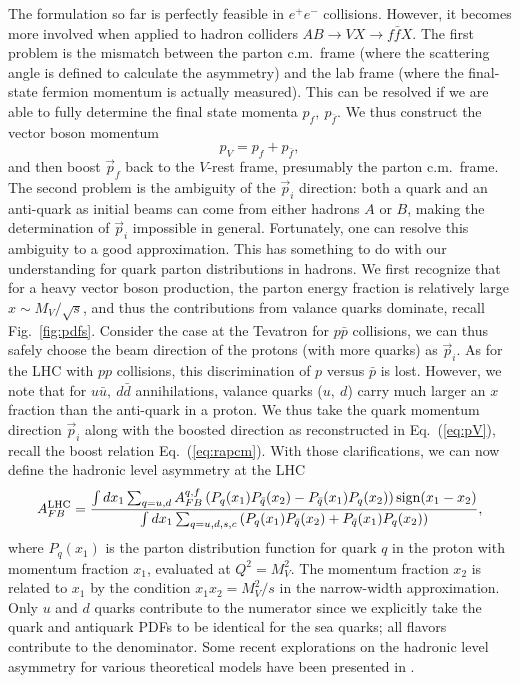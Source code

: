 \documentclass[12pt,prd,aps,floats,preprintnumbers,preprint,superscriptaddress,floatfix,nofootinbib]{revtex4}
\def\epem{e^+e^-}
\def\be{\begin{equation}}
\def\ee{\end{equation}}
\begin{document}
The formulation so far is perfectly feasible in $\epem$ collisions. However,
it becomes more involved when applied to hadron colliders
$AB \to V X \to f \bar f X.$ The first problem
is  the mismatch between the parton c.m.~frame (where the scattering angle
is defined to calculate the asymmetry) 
and the lab frame (where the final-state fermion momentum is actually 
measured). This can be resolved if we are able to fully determine the final
state momenta $p_f,\ p_{\bar f}$.
We thus construct the vector boson momentum 
\be
p^{}_V = p_f + p_{\bar f}, 
\label{eq:pV}
\ee
and then boost $\vec p_f$ back to the $V$-rest frame, presumably the parton
c.m.~frame.
The second problem is the ambiguity of the $\vec p_i$ direction: both a quark 
and an anti-quark  as initial beams 
can come from either hadrons $A$ or $B$, making the 
determination of $\vec p_i$ impossible in general. Fortunately, one can
resolve this ambiguity to a good approximation. This has something to do
with our understanding for quark parton distributions in hadrons. We  first
recognize that for a heavy vector boson production, the parton energy
fraction is relatively large $x\sim M_V/\sqrt s$, and thus the contributions 
from valance quarks dominate, recall Fig.~\ref{fig:pdfs}. 
Consider the case at the Tevatron for $p \bar p$ collisions, 
we can thus safely choose the beam direction of the protons (with more 
quarks) as $\vec p_i$.
As for the LHC with $pp$ collisions, this discrimination of $p$ versus $\bar p$
is lost. However, we note that for $u\bar u,\ d\bar d$ annihilations, valance
quarks ($u,\ d$) carry much larger an $x$ fraction than the anti-quark in a proton.
We thus take the quark momentum direction $\vec p_i$ along with the
boosted direction as reconstructed in Eq.~(\ref{eq:pV}), 
recall the boost relation Eq.~(\ref{eq:rapcm}). With those clarifications, 
we can now define the hadronic level asymmetry at the LHC \cite{Rosner}
\begin{equation}
	A_{FB}^{\rm LHC} = 
	\frac{ \int dx_1 \sum_{q=u,d} A_{FB}^{q,f} 
	\left( P_q(x_1)P_{\bar q}(x_2) - P_{\bar q}(x_1)P_q(x_2) \right) 
	{\rm sign}(x_1-x_2)}
	{ \int dx_1 \sum_{q=u,d,s,c} 
	\left(P_q(x_1)P_{\bar q}(x_2) + P_{\bar q}(x_1)P_q(x_2) \right) },
	\label{eq:Afbcalc}
\end{equation}
where $P_q(x_1)$ is the parton distribution function for quark $q$ in the 
proton with momentum fraction $x_1$, evaluated at $Q^2 = M_V^2$.
The momentum fraction $x_2$ is related to $x_1$ by the condition 
$x_1x_2 = M_V^2/s$ in the narrow-width approximation.
Only $u$ and $d$ quarks contribute to the numerator since we explicitly 
take the quark and antiquark PDFs to be identical for the sea quarks;
all flavors contribute to the denominator. Some recent explorations on
the hadronic level asymmetry for various theoretical models 
have been presented in \cite{smoking}.
\end{document}
